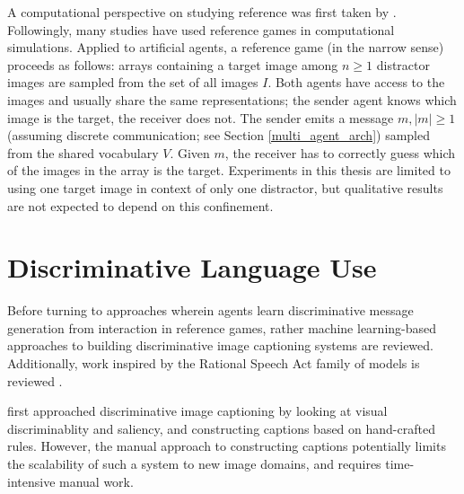  A computational perspective on studying reference was first taken by \cite{dale1995computational}. Followingly, many studies have used reference games in computational simulations. Applied to artificial agents, a reference game (in the narrow sense) proceeds as follows: arrays containing a target image among $n \geq 1$ distractor images are sampled from the set of all images $I$. Both agents have access to the images and usually share the same representations; the sender agent knows which image is the target, the receiver does not. The sender emits a message $m, |m| \geq 1$ (assuming discrete communication; see Section \ref{multi_agent_arch}) sampled from the shared vocabulary $V$. Given $m$, the receiver has to correctly guess which of the images in the array is the target. Experiments in this thesis are limited to using one target image in context of only one distractor, but qualitative results are not expected to depend on this confinement.


\section{Discriminative Language Use}
\label{discriminative_lang}

Before turning to approaches wherein agents learn discriminative message generation from interaction in reference games, rather machine learning-based approaches to building discriminative image captioning systems are reviewed. Additionally, work inspired by the Rational Speech Act family of models is reviewed \parencite{goodman2016pragmatic}.

\cite{sadovnik2012image} first approached discriminative image captioning by looking at visual discriminablity and saliency, and constructing captions based on hand-crafted rules. However, the manual approach to constructing captions potentially limits the scalability of such a system to new image domains, and requires time-intensive manual work. 

